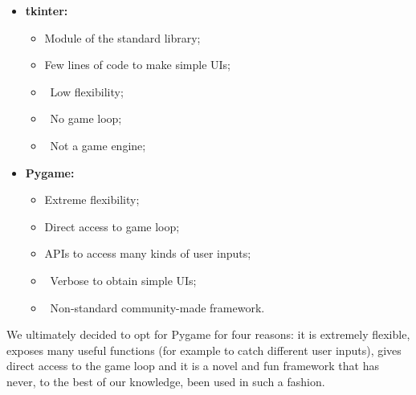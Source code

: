 \begin{itemize}
  \item \textbf{tkinter:} 
    \begin{itemize} 
      \item \faThumbsUp[regular] Module of the standard library;
      \item \faThumbsUp[regular] Few lines of code to make simple UIs;
      \item \faThumbsDown\ Low flexibility;
      \item \faThumbsDown\ No game loop;
      \item \faThumbsDown\ Not a game engine;
    \end{itemize}
  \item \textbf{Pygame:}
    \begin{itemize}
      \item \faThumbsUp[regular] Extreme flexibility;
      \item \faThumbsUp[regular] Direct access to game loop;
      \item \faThumbsUp[regular] APIs to access many kinds of user inputs;
      \item \faThumbsDown\ Verbose to obtain simple UIs;
      \item \faThumbsDown\ Non-standard community-made framework.
    \end{itemize}
\end{itemize}

We ultimately decided to opt for Pygame for four reasons: it is extremely flexible, exposes many useful functions (for example to catch different user inputs), gives direct access to the game loop and it is a novel and fun framework that has never, to the best of our knowledge, been used in such a fashion. 